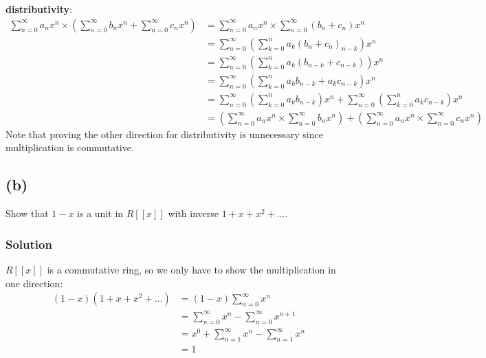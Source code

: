 \documentclass[fleqn]{article}
\begin{document}
            \textbf{distributivity}:
            \begin{align}
                \sum\limits_{n = 0}^{\infty} a_n x^n \times \left(\sum\limits_{n = 0}^{\infty} b_n x^n + \sum\limits_{n = 0}^{\infty} c_n x^n\right)
                    &= \sum\limits_{n = 0}^{\infty} a_n x^n \times \sum\limits_{n = 0}^{\infty} (b_n + c_n) x^n \\
                    &= \sum\limits_{n = 0}^{\infty} \left(\sum\limits_{k = 0}^{n} a_k (b_n + c_n)_{n - k}\right) x^n \\
                    &= \sum\limits_{n = 0}^{\infty} \left(\sum\limits_{k = 0}^{n} a_k (b_{n - k} + c_{n - k})\right) x^n \\
                    &= \sum\limits_{n = 0}^{\infty} \left(\sum\limits_{k = 0}^{n} a_k b_{n - k} + a_k c_{n - k}\right) x^n \\
                    &= \sum\limits_{n = 0}^{\infty} \left(\sum\limits_{k = 0}^{n} a_k b_{n - k}\right) x^n + \sum\limits_{n = 0}^{\infty} \left(\sum\limits_{k = 0}^{n} a_k c_{n - k}\right) x^n \\
                    &= \left(\sum\limits_{n = 0}^{\infty} a_n x^n \times \sum\limits_{n = 0}^{\infty} b_n x^n\right) + \left(\sum\limits_{n = 0}^{\infty} a_n x^n \times \sum\limits_{n = 0}^{\infty} c_n x^n\right)
            \end{align}
            Note that proving the other direction for distributivity is unnecessary since multiplication is commutative.
        
        \subsection{(b)}
        Show that $1 - x$ is a unit in $R[[x]]$ with inverse $1 + x + x^2 + ...$.
            
            \subsubsection{Solution}
            $R[[x]]$ is a commutative ring, so we only have to show the multiplication in one direction:
            \begin{align}
                (1 - x)(1 + x + x^2 + ...)
                    &= (1 - x) \sum\limits_{n = 0}^{\infty} x^n \\
                    &= \sum\limits_{n = 0}^{\infty} x^n - \sum\limits_{n = 0}^{\infty} x^{n + 1} \\
                    &= x^0 + \sum\limits_{n = 1}^{\infty} x^n - \sum\limits_{n = 1}^{\infty} x^n \\
                    &= 1
            \end{align}
        
\end{document}
